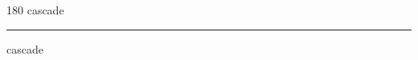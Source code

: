 
\begin{frame}
\begin{center}
\begin{turn}{180}
{\fontsize{2.5cm}{1em}\selectfont cascade}
\end{turn}
\vspace{1em}\par  
\hrule
\vspace{1em}\par  
{\fontsize{2.5cm}{1em}\selectfont cascade}
\end{center}
\end{frame}
